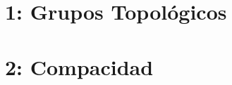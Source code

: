 \documentclass[10pt]{report}
\begin{document}
\chapter*{1: Grupos Topol\'ogicos}


\chapter*{2: Compacidad}
\end{document}
